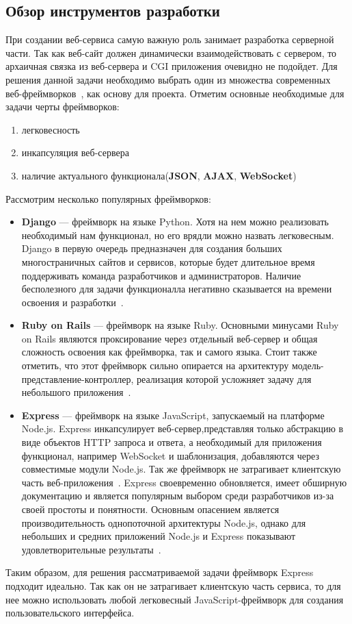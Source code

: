 \subsection{Обзор инструментов разработки}
При создании веб-сервиса самую важную роль занимает разработка серверной части. Так как веб-сайт должен динамически взаимодействовать с сервером, то архаичная связка из веб-сервера и CGI приложения очевидно не подойдет. Для решения данной задачи необходимо выбрать один из множества современных веб-фреймворков~\autocite{wiki}, как основу для проекта. Отметим основные необходимые для задачи черты фреймворков:
 \begin{enumerate}
 	\item легковесность
 	\item инкапсуляция веб-сервера
 	\item наличие актуального функционала(\textbf{JSON}, \textbf{AJAX}, \textbf{WebSocket})
 \end{enumerate}
Рассмотрим несколько популярных фреймворков:
 \begin{itemize}
 	\item \textbf{Django} --- фреймворк на языке Python. Хотя на нем можно реализовать необходимый нам функционал, но его врядли можно назвать легковесным. Django в первую очередь предназначен для создания больших многостраничных сайтов и сервисов, которые будет длительное время поддерживать команда разработчиков и администраторов. Наличие бесполезного для задачи функционалла негативно сказывается на времени освоения и разработки~\autocite{django}.  
 	\item \textbf{Ruby on Rails} --- фреймворк на языке Ruby. Основными минусами Ruby on Rails являются проксирование через отдельный веб-сервер и общая сложность освоения как фреймворка, так и самого языка. Стоит также отметить, что этот фреймворк сильно опирается на архитектуру модель-представление-контроллер, реализация которой усложняет задачу для небольшого приложения~\autocite{ruby}.  
 	\item \textbf{Express} --- фреймворк на языке JavaScript, запускаемый на платформе Node.js. Express инкапсулирует веб-сервер,представляя только абстракцию в виде объектов HTTP запроса и ответа, а необходимый для приложения функционал, например WebSocket и шаблонизация, добавляются через совместимые модули Node.js. Так же фреймворк не затрагивает клиентскую часть веб-приложения~\autocite{express}. Express своевременно обновляется, имеет обширную документацию и является популярным выбором среди разработчиков из-за своей простоты и понятности. Основным опасением является производительность однопоточной архитектуры Node.js, однако для небольших и средних приложений Node.js и Express показывают удовлетворительные результаты~\autocite{Kai14}.
 \end{itemize}
Таким образом, для решения рассматриваемой задачи фреймворк Express подходит идеально. Так как он не затрагивает клиентскую часть сервиса, то для нее можно использовать любой легковесный JavaScript-фреймворк для создания пользовательского интерфейса.

